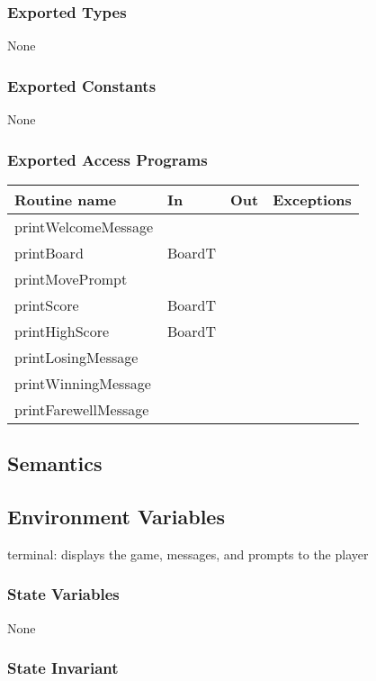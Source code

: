 \documentclass[12pt]{article}
\begin{document}
\subsubsection* {Exported Types}

None

\subsubsection* {Exported Constants}

None

\subsubsection* {Exported Access Programs}

\begin{tabular}{| l | l | l | p{6cm} |}
\hline
\textbf{Routine name} & \textbf{In} & \textbf{Out} & \textbf{Exceptions}\\
\hline
printWelcomeMessage & ~ & ~ &  \\
\hline
printBoard & BoardT & ~ & \\
\hline
printMovePrompt & ~ & ~ & \\
\hline
printScore & BoardT & ~ & \\
\hline
printHighScore & BoardT & ~ & \\
\hline
printLosingMessage & ~ & ~ & \\
\hline
printWinningMessage & ~ & ~ & \\
\hline
printFarewellMessage & ~ & ~ & \\
\hline
\end{tabular}

\subsection* {Semantics}

\subsection*{Environment Variables}

terminal: displays the game, messages, and prompts to the player

\subsubsection* {State Variables}

None

\subsubsection* {State Invariant}
\end{document}

